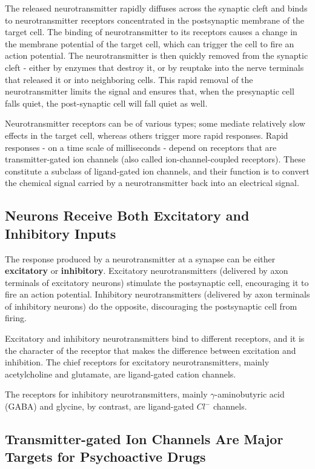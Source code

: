 The released neurotransmitter rapidly diffuses across the synaptic cleft
and binds to neurotransmitter receptors concentrated in the postsynaptic
membrane of the target cell. The binding of neurotransmitter to its
receptors causes a change in the membrane potential of the target cell,
which can trigger the cell to fire an action potential. The neurotransmitter
is then quickly removed from the synaptic cleft - either by enzymes that
destroy it, or by reuptake into the nerve terminals that released it or into
neighboring cells. This rapid removal of the neurotransmitter limits the
signal and ensures that, when the presynaptic cell falls quiet, the post-synaptic
cell will fall quiet as well.

Neurotransmitter receptors can be of various types; some mediate relatively
slow effects in the target cell, whereas others trigger more rapid
responses. Rapid responses - on a time scale of milliseconds - depend
on receptors that are transmitter-gated ion channels (also called ion-channel-coupled
receptors). These constitute a subclass of ligand-gated ion
channels, and their function is to convert the chemical signal carried by a
neurotransmitter back into an electrical signal.

\subsection{Neurons Receive Both Excitatory and Inhibitory Inputs}

The response produced by a neurotransmitter at a synapse can be either
\textbf{excitatory} or \textbf{inhibitory}. Excitatory neurotransmitters (delivered by axon
terminals of excitatory neurons) stimulate the postsynaptic cell, encouraging
it to fire an action potential. Inhibitory neurotransmitters (delivered
by axon terminals of inhibitory neurons) do the opposite, discouraging
the postsynaptic cell from firing.

Excitatory and inhibitory neurotransmitters bind to different receptors,
and it is the character of the receptor that makes the difference between
excitation and inhibition. The chief receptors for excitatory neurotransmitters,
mainly acetylcholine and glutamate, are ligand-gated cation
channels.

The receptors for inhibitory neurotransmitters, mainly $\gamma$-aminobutyric acid (GABA)
and glycine, by contrast, are ligand-gated $Cl^{-}$ channels.

\subsection{Transmitter-gated Ion Channels Are Major Targets for Psychoactive Drugs}

